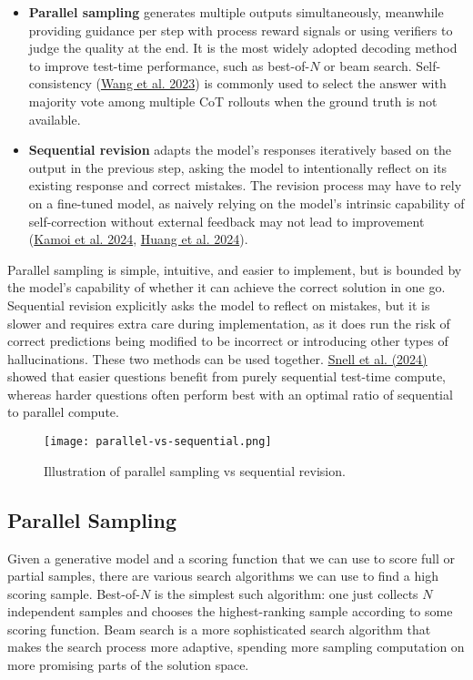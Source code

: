 \documentclass[12pt]{article}
\begin{document}
\begin{itemize}
    \item \textbf{Parallel sampling} generates multiple outputs simultaneously, meanwhile providing guidance per step with process reward signals or using verifiers to judge the quality at the end. It is the most widely adopted decoding method to improve test-time performance, such as best-of-$N$ or beam search. Self-consistency (\href{https://arxiv.org/abs/2203.11171}{Wang et al. 2023}) is commonly used to select the answer with majority vote among multiple CoT rollouts when the ground truth is not available.
    \item \textbf{Sequential revision} adapts the model’s responses iteratively based on the output in the previous step, asking the model to intentionally reflect on its existing response and correct mistakes. The revision process may have to rely on a fine-tuned model, as naively relying on the model’s intrinsic capability of self-correction without external feedback may not lead to improvement (\href{https://arxiv.org/abs/2406.01297}{Kamoi et al. 2024}, \href{https://arxiv.org/abs/2310.01798}{Huang et al. 2024}).
\end{itemize}

Parallel sampling is simple, intuitive, and easier to implement, but is bounded by the model’s capability of whether it can achieve the correct solution in one go. Sequential revision explicitly asks the model to reflect on mistakes, but it is slower and requires extra care during implementation, as it does run the risk of correct predictions being modified to be incorrect or introducing other types of hallucinations. These two methods can be used together. \href{https://arxiv.org/abs/2408.03314}{Snell et al. (2024)} showed that easier questions benefit from purely sequential test-time compute, whereas harder questions often perform best with an optimal ratio of sequential to parallel compute.

\begin{figure}[h]
    \centering
    \texttt{[image: parallel-vs-sequential.png]}
    \caption{Illustration of parallel sampling vs sequential revision.}
\end{figure}

\subsection{Parallel Sampling}

Given a generative model and a scoring function that we can use to score full or partial samples, there are various search algorithms we can use to find a high scoring sample. Best-of-$N$ is the simplest such algorithm: one just collects $N$ independent samples and chooses the highest-ranking sample according to some scoring function. Beam search is a more sophisticated search algorithm that makes the search process more adaptive, spending more sampling computation on more promising parts of the solution space.
\end{document}
